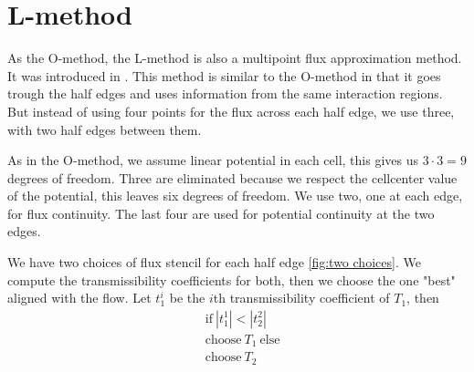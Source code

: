 \documentclass[../Main/main.tex]{subfiles}
\begin{document}
\section*{L-method}
As the O-method, the L-method is also a multipoint flux approximation method. It was introduced in \cite{https://doi.org/10.1002/num.20320}. This method is similar to the O-method in that it goes trough the half edges and uses information from the same interaction regions. But instead of using four points for the flux across each half edge, we use three, with two half edges between them. \par
As in the O-method, we assume linear potential in each cell, this gives us $3\cdot 3 = 9$ degrees of freedom. Three are eliminated because we respect the cellcenter value of the potential, this leaves six degrees of freedom. We use two, one at each edge, for flux continuity. The last four are used for potential continuity at the two edges. 
\par
We have two choices of flux stencil for each half edge \ref{fig:two choices}. We compute the transmissibility coefficients for both, then we choose the one "best" aligned with the flow. Let $t_1^i$ be the $i$th transmissibility coefficient of $T_1$, then
\begin{equation}\label{eq:L-criterion}
	\begin{aligned}
		&\text{if} \ |t^1_1| < |t^2_2| \\
		&\text{choose} \ T_1 \ \text{else} \\
		&\text{choose} \ T_2
	\end{aligned}
\end{equation}
\end{document}
